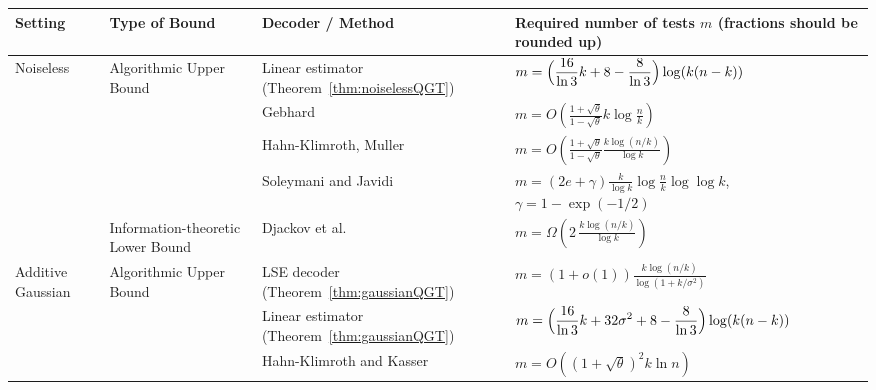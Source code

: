 \documentclass{article}
\begin{document}
\begin{table}[t]
\vspace{0.2cm}
\centering
\scriptsize
\setlength{\tabcolsep}{4.5pt}
\renewcommand{\arraystretch}{1.35}

\begin{tabular}{p{2.2cm} p{3.6cm} p{4.6cm} p{7.0cm}}
\hline
\textbf{Setting} & \textbf{Type of Bound} & \textbf{Decoder / Method} & \textbf{Required number of tests $m$ (fractions should be rounded up)} \\
\hline

\multirow{5}{*}{Noiseless}
& \multirow{4}{*}{Algorithmic Upper Bound}
& Linear estimator (Theorem~\ref{thm:noiselessQGT})
& $\displaystyle m = \Bigl(\frac{16}{\ln 3}k + 8 - \frac{8}{\ln 3}\Bigr)\log(k(n-k))$
\\

& & Gebhard~\cite{gebhard2019quantitative}
& $\displaystyle m = O\left(\frac{1+\sqrt{\theta}}{1-\sqrt{\theta}}k\log\frac{n}{k}\right)$
\\

& & Hahn-Klimroth, Muller~\cite{hahn-klimroth_near-optimal_2023,hahn-klimroth_near_2022}
& $\displaystyle m = O\left(\frac{1+\sqrt{\theta}}{1-\sqrt{\theta}}\frac{k\log(n/k)}{\log k}\right)$
\\

& & Soleymani and Javidi~\cite{soleymani_quantitative_2024}
& $\displaystyle m = (2e+\gamma)\frac{k}{\log k}\log\frac{n}{k}\log\log k$, $\gamma = 1-\exp(-1/2)$
\\

\cline{2-4}

& Information-theoretic Lower Bound
& Djackov et al.~\cite{djackov1975}
& $\displaystyle m = \Omega\left(2\,\frac{k\log(n/k)}{\log k}\right)$
\\

\hline

\multirow{4}{*}{Additive Gaussian}
& \multirow{3}{*}{Algorithmic Upper Bound}
& LSE decoder (Theorem~\ref{thm:gaussianQGT})
& $\displaystyle m = (1+o(1))\frac{k\log(n/k)}{\log(1+k/\sigma^2)}$
\\

& & Linear estimator (Theorem~\ref{thm:gaussianQGT})
& $\displaystyle m = \Bigl(\frac{16}{\ln 3}k + 32\sigma^2 + 8 - \frac{8}{\ln 3}\Bigr)\log(k(n-k))$
\\

& & Hahn-Klimroth and Kasser~\cite{hahn-klimroth_distributed_2022}
& $\displaystyle m = O\left((1+\sqrt{\theta})^2 k \ln n\right)$
\\


\end{tabular}
\end{table}
\end{document}

